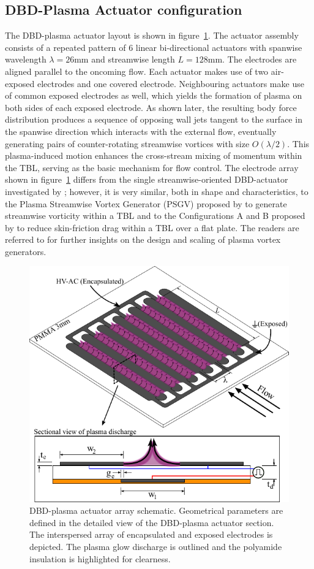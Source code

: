\subsection{DBD-Plasma Actuator configuration \label{ss:PlasmaActuator}}
The DBD-plasma actuator layout is shown in figure~\ref{fig:3D_PA_detail}. The actuator assembly consists of a repeated pattern of 6 linear bi-directional actuators with spanwise wavelength $\lambda = 26 \mathrm{mm}$ and streamwise length $L = 128 \mathrm{mm}$. The electrodes are aligned parallel to the oncoming flow. Each actuator makes use of two air-exposed electrodes and one covered electrode. Neighbouring actuators make use of common exposed electrodes as well, which yields the formation of plasma on both sides of each exposed electrode. As shown later, the resulting body force distribution produces a sequence of opposing wall jets tangent to the surface in the spanwise direction which interacts with the external flow, eventually generating pairs of counter-rotating streamwise vortices with size $O(\lambda/2)$. This plasma-induced motion enhances the cross-stream mixing of momentum within the TBL, serving as the basic mechanism for flow control. The electrode array shown in figure~\ref{fig:3D_PA_detail} differs from the single streamwise-oriented DBD-actuator investigated by \citet{jukes2013plasmaVG}; however, it is very similar, both in shape and characteristics, to the Plasma Streamwise Vortex Generator (PSGV) proposed by \citet{Wicks2015} to generate streamwise vorticity within a TBL and to the Configurations A and B proposed by \citet{cheng_wong_hussain_schroder_zhou_2021} to reduce skin-friction drag within a TBL over a flat plate. The readers are referred to \citet{Kelley2016} for further insights on the design and scaling of plasma vortex generators.
\begin{figure}[t]
    \centering
    \includegraphics[width = 0.65\linewidth]{figures/methodology/3D_PA_detail_v3.pdf}
    \caption{DBD-plasma actuator array schematic. Geometrical parameters are defined in the detailed view of the DBD-plasma actuator section. The interspersed array of encapsulated and exposed electrodes  is depicted. The plasma glow discharge is outlined  and the polyamide insulation is highlighted  for clearness.}  \label{fig:3D_PA_detail}
\end{figure}
